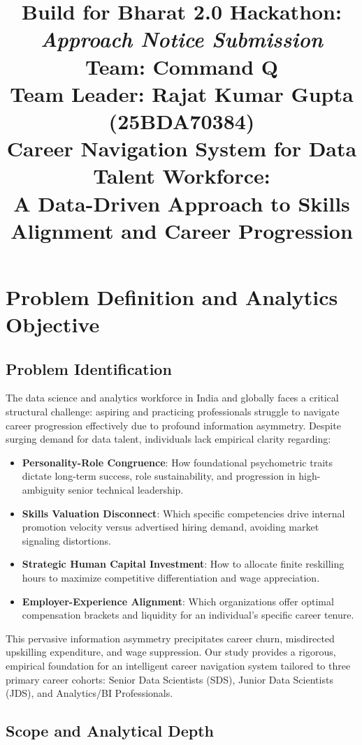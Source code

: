 \documentclass[conference]{IEEEtran}
\title{%
\textbf{Build for Bharat 2.0 Hackathon:}\\
\textit{Approach Notice Submission}\\[0.45em]
\large\textbf{Team: Command Q}\\
\normalsize Team Leader: Rajat Kumar Gupta (25BDA70384)\\[0.7em]
\large\textbf{Career Navigation System for Data Talent Workforce:}\\
\large A Data-Driven Approach to Skills Alignment and Career Progression
}
\author{\IEEEauthorblockN{Command Q}}
\begin{document}
\maketitle

\section{Problem Definition and Analytics Objective}

\subsection{Problem Identification}

The data science and analytics workforce in India and globally faces a critical structural challenge: aspiring and practicing professionals struggle to navigate career progression effectively due to profound information asymmetry. Despite surging demand for data talent, individuals lack empirical clarity regarding:
\begin{itemize}
    \item \textbf{Personality-Role Congruence}: How foundational psychometric traits dictate long-term success, role sustainability, and progression in high-ambiguity senior technical leadership.
    \item \textbf{Skills Valuation Disconnect}: Which specific competencies drive internal promotion velocity versus advertised hiring demand, avoiding market signaling distortions.
    \item \textbf{Strategic Human Capital Investment}: How to allocate finite reskilling hours to maximize competitive differentiation and wage appreciation.
    \item \textbf{Employer-Experience Alignment}: Which organizations offer optimal compensation brackets and liquidity for an individual's specific career tenure.
\end{itemize}

This pervasive information asymmetry precipitates career churn, misdirected upskilling expenditure, and wage suppression. Our study provides a rigorous, empirical foundation for an intelligent career navigation system tailored to three primary career cohorts: Senior Data Scientists (SDS), Junior Data Scientists (JDS), and Analytics/BI Professionals.

\subsection{Scope and Analytical Depth}
\end{document}
